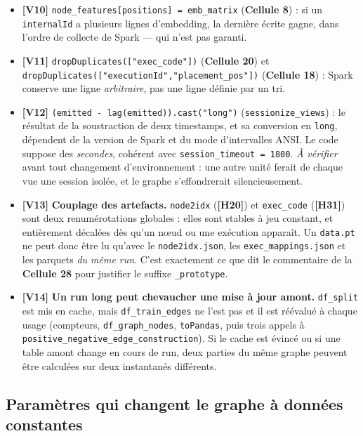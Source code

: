 \documentclass[11pt,a4paper]{article}
\newcommand{\code}[1]{\texttt{\small #1}}
\newcommand{\hyp}[1]{\textcolor{hypcol}{\textbf{\small [#1]}}}
\newcommand{\cell}[1]{\textbf{Cellule #1}}
\begin{document}
\begin{itemize}[leftmargin=*]
  \item \hyp{V10} \code{node\_features[positions] = emb\_matrix} (\cell{8}) : si un
        \code{internalId} a plusieurs lignes d'embedding, la dernière écrite gagne,
        dans l'ordre de collecte de Spark --- qui n'est pas garanti.
  \item \hyp{V11} \code{dropDuplicates(["exec\_code"])} (\cell{20}) et
        \code{dropDuplicates(["executionId","placement\_pos"])} (\cell{18}) :
        Spark conserve une ligne \emph{arbitraire}, pas une ligne définie par un tri.
  \item \hyp{V12} \code{(emitted - lag(emitted)).cast("long")}
        (\code{sessionize\_views}) : le résultat de la soustraction de deux
        timestamps, et sa conversion en \code{long}, dépendent de la version de Spark
        et du mode d'intervalles ANSI. Le code suppose des \emph{secondes}, cohérent
        avec \code{session\_timeout = 1800}. \emph{À vérifier} avant tout changement
        d'environnement : une autre unité ferait de chaque vue une session isolée, et
        le graphe s'effondrerait silencieusement.
  \item \hyp{V13} \textbf{Couplage des artefacts.} \code{node2idx} (\hyp{H20}) et
        \code{exec\_code} (\hyp{H31}) sont deux renumérotations globales : elles sont
        stables à jeu constant, et entièrement décalées dès qu'un nœud ou une
        exécution apparaît. Un \code{data.pt} ne peut donc être lu qu'avec le
        \code{node2idx.json}, les \code{exec\_mappings.json} et les parquets
        \emph{du même run}. C'est exactement ce que dit le commentaire de la
        \cell{28} pour justifier le suffixe \code{\_prototype}.
  \item \hyp{V14} \textbf{Un run long peut chevaucher une mise à jour amont.}
        \code{df\_split} est mis en cache, mais \code{df\_train\_edges} ne l'est pas
        et il est réévalué à chaque usage (compteurs, \code{df\_graph\_nodes},
        \code{toPandas}, puis trois appels à
        \code{positive\_negative\_edge\_construction}). Si le cache est évincé ou si
        une table amont change en cours de run, deux parties du même graphe peuvent
        être calculées sur deux instantanés différents.
\end{itemize}

\subsection{Paramètres qui changent le graphe à données constantes}
\end{document}
